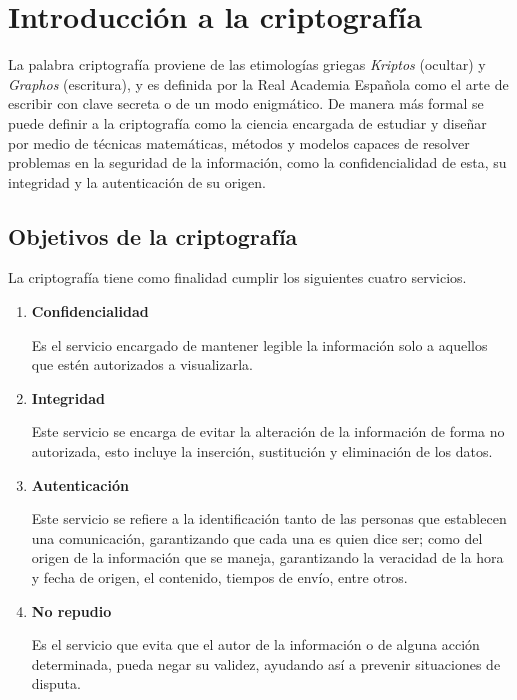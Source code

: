 %
%

\section{Introducción a la criptografía}

La palabra criptografía proviene de las etimologías griegas \textit{Kriptos}
(ocultar) y \textit{Graphos} (escritura), y es definida por la Real Academia
Española como el arte de escribir con clave secreta o de un modo enigmático.
De manera más formal se puede definir a la criptografía como la ciencia
encargada de estudiar y diseñar por medio de técnicas matemáticas, métodos y
modelos capaces de resolver problemas en la seguridad de la información, como
la confidencialidad de esta, su integridad y la autenticación de su origen.

  \subsection{Objetivos de la criptografía}

    La criptografía tiene como finalidad cumplir los siguientes cuatro
    servicios.

    \begin{enumerate}

      \item \textbf{Confidencialidad}

        Es el servicio encargado de mantener legible la información solo a
        aquellos que estén autorizados a visualizarla.

      \item \textbf{Integridad}

        Este servicio se encarga de evitar la alteración de la información de
        forma no autorizada, esto incluye la inserción, sustitución y
        eliminación de los datos.

      \item \textbf{Autenticación}

        Este servicio se refiere a la identificación tanto de las personas que
        establecen una comunicación, garantizando que cada una es quien dice
        ser; como del origen de la información que se maneja, garantizando la
        veracidad de la hora y fecha de origen, el contenido, tiempos de
        envío, entre otros.

      \item \textbf{No repudio}

        Es el servicio que evita que el autor de la información o de alguna
        acción determinada, pueda negar su validez, ayudando así a prevenir
        situaciones de disputa.

    \end{enumerate}

